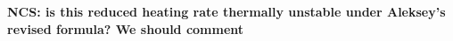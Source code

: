 \documentclass[usenatbib,fleqn]{mn2e}
\newcommand\lsim{\mathrel{\rlap{\lower4pt\hbox{\hskip1pt$\sim$}}
    \raise1pt\hbox{$<$}}}
\newcommand{\rs}{r_s}
\newcommand{\Mbh}[1][]{M_{\bullet#1}}
\newcommand{\rIa}{r_{\rm Ia}}
\newcommand{\vwO}{v_{w}}
\newcommand{\tage}{t_{\star}}
\begin{document}
{\bf NCS: is this reduced heating rate thermally unstable under Aleksey's revised formula?  We should comment}









\end{document}

